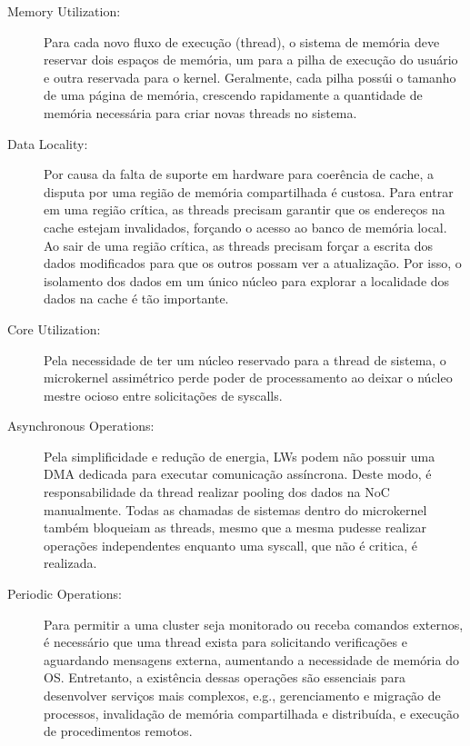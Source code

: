 	\begin{description}

		\item[Memory Utilization:] Para cada novo fluxo de execução (thread),
			o sistema de memória deve reservar dois espaços de memória, um
			para a pilha de execução do usuário e outra reservada para
			o kernel. Geralmente, cada pilha possúi o tamanho de uma página de
			memória, crescendo rapidamente a quantidade de memória necessária
			para criar novas threads no sistema.

		\item[Data Locality:] Por causa da falta de suporte em hardware para
			coerência de cache, a disputa por uma região de memória
			compartilhada é custosa. Para entrar em uma região crítica, as
			threads precisam garantir que os endereços na cache estejam
			invalidados, forçando o acesso ao banco de memória local. Ao sair
			de uma região crítica, as threads precisam forçar a escrita dos
			dados modificados para que os outros possam ver a atualização.
			Por isso, o isolamento dos dados em um único núcleo para explorar
			a localidade dos dados na cache é tão importante.

		\item[Core Utilization:] Pela necessidade de ter um núcleo reservado
			para a thread de sistema, o microkernel assimétrico perde poder
			de processamento ao deixar o núcleo mestre ocioso entre
			solicitações de syscalls.

		\item[Asynchronous Operations:] Pela simplificidade e redução de
			energia, LWs podem não possuir uma DMA dedicada para executar
			comunicação assíncrona. Deste modo, é responsabilidade da thread
			realizar pooling dos dados na NoC manualmente. Todas as chamadas de
			sistemas dentro do microkernel também bloqueiam as threads, mesmo que
			a mesma pudesse realizar operações independentes enquanto uma syscall,
			que não é critica, é realizada.

		\item[Periodic Operations:] Para permitir a uma cluster seja monitorado
			ou receba comandos externos, é necessário que uma thread exista para
			solicitando verificações e aguardando mensagens externa, aumentando
			a necessidade de memória do OS. Entretanto, a existência dessas
			operações são essenciais para desenvolver serviços mais complexos,
			e.g., gerenciamento e migração de processos, invalidação de memória
			compartilhada e distribuída, e execução de procedimentos remotos.

	\end{description}

